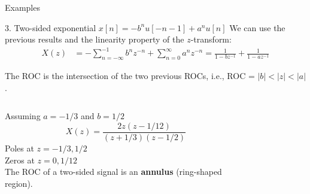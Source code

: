 \documentclass[10pt, aspectratio=169]{beamer}
\begin{document}
\begin{frame}{Examples}

\begin{block}{3. Two-sided exponential $x[n] = -b^nu[-n-1] + a^nu[n]$}
	We can use the previous results and the linearity property of the $z$-transform:
	\vspace{-0.25cm}
	\begin{align*} 
	X(z) &= -\sum_{n=-\infty}^{-1} b^nz^{-n} + \sum_{n=0}^\infty a^nz^{-n} = \frac{1}{1-bz^{-1}} + \frac{1}{1-az^{-1}} 
	\end{align*}
	
	The ROC is the intersection of the two previous ROCs, i.e., ROC = $|b| < |z| < |a|$.

	\begin{columns}
		\begin{column}{0.6\textwidth}
			Assuming $a = -1/3$ and $b=1/2$
			\begin{equation*} 
			X(z) = \frac{2z(z-1/12)}{(z+1/3)(z-1/2)}
			\end{equation*}
			Poles at $z = -1/3, 1/2$\\
			Zeros at $z = 0, 1/12$
			~\\
			The ROC of a two-sided signal is an \textbf{annulus} (ring-shaped region).
			
		\end{column}
		\begin{column}{0.4\textwidth}  %
			\begin{figure}
				\centering
				\resizebox{0.95\linewidth}{!}{}
				\label{fig:left_sided_exp}
			\end{figure}
		\end{column}
	\end{columns}
	
\end{block}
\end{frame}
\end{document}
